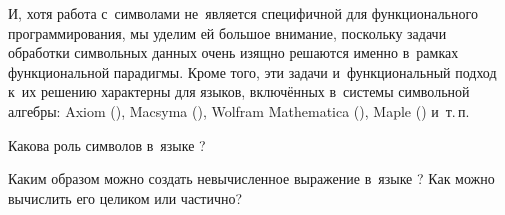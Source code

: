 И, хотя работа с~символами не~является специфичной для функционального программирования, мы уделим ей большое внимание, поскольку задачи обработки символьных данных очень изящно решаются именно в~рамках функциональной парадигмы. Кроме того, эти задачи и~функциональный подход к~их решению характерны для языков, включённых в~системы символьной алгебры: Axiom (), Macsyma (\Lisp), Wolfram Mathematica (), Maple () и~т.\,п.

\begin{Queeze}
 \item Какова роль символов в~языке \Scheme?

 \item Каким образом можно создать невычисленное выражение в~языке \Scheme? Как можно вычислить его целиком или частично?
\end{Queeze}
